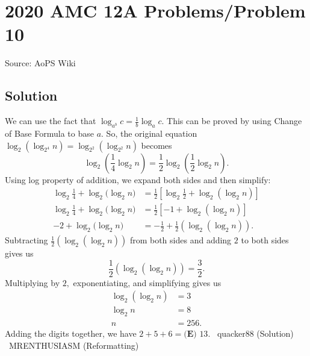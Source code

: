 \documentclass[12pt]{article}
\begin{document}
\section*{{2020 AMC 12A Problems/Problem 10}}
Source: AoPS Wiki

\subsection*{Solution}
We can use the fact that $\log_{a^b} c = \frac{1}{b} \log_a c.$ This can be proved by using Change of Base Formula to base $a.$ So, the original equation $\log_2{(\log_{2^4}{n})} = \log_{2^2}{(\log_{2^2}{n})}$ becomes \[\log_2\left({\frac{1}{4}\log_{2}{n}}\right) = \frac{1}{2}\log_2\left({\frac{1}{2}\log_2{n}}\right).\] Using log property of addition, we expand both sides and then simplify: \begin{align*} \log_2{\frac{1}{4}}+\log_2{(\log_{2}{n}}) &= \frac{1}{2}\left[\log_2{\frac{1}{2}} +\log_{2}{(\log_2{n})}\right] \\ \log_2{\frac{1}{4}}+\log_2{(\log_{2}{n}}) &= \frac{1}{2}\left[-1 +\log_{2}{(\log_2{n})}\right] \\ -2+\log_2{(\log_{2}{n}}) &= -\frac{1}{2}+ \frac{1}{2}(\log_{2}{(\log_2{n})}). \end{align*} Subtracting $\frac{1}{2}(\log_{2}{(\log_2{n})})$ from both sides and adding $2$ to both sides gives us \[\frac{1}{2}(\log_{2}{(\log_2{n})}) = \frac{3}{2}.\] Multiplying by $2,$ exponentiating, and simplifying gives us \begin{align*} \log_{2}{(\log_2{n})} &= 3 \\ \log_2{n}&=8 \\ n&=256. \end{align*} Adding the digits together, we have $2+5+6=\boxed{\textbf{(E) } 13}.$ ~quacker88 (Solution) ~MRENTHUSIASM (Reformatting)
\end{document}
